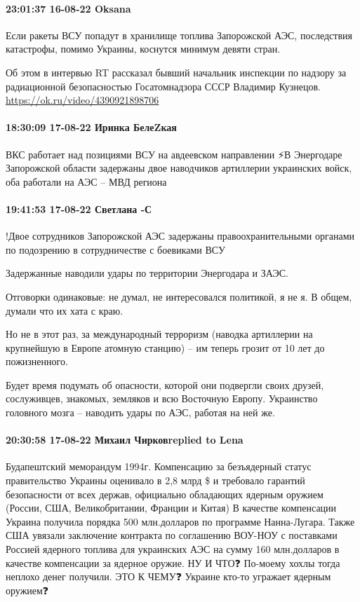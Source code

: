 \paragraph{23:01:37 16-08-22 Oksana 🌸🌸🌸}

Если ракеты ВСУ попадут в хранилище топлива Запорожской АЭС, последствия
катастрофы, помимо Украины, коснутся минимум девяти стран.

Об этом в интервью RT рассказал бывший начальник инспекции по надзору за
радиационной безопасностью Госатомнадзора СССР Владимир Кузнецов.
\url{https://ok.ru/video/4390921898706}

\paragraph{18:30:09 17-08-22 Иринка БелеZкая}

\obeycr
ВКС работает над позициями ВСУ на авдеевском направлении
⚡В Энергодаре Запорожской области задержаны двое наводчиков артиллерии украинских войск, оба работали на АЭС – МВД региона
\restorecr

\paragraph{19:41:53 17-08-22 Светлана -С}

!Двое сотрудников Запорожской АЭС задержаны правоохранительными органами по
подозрению в сотрудничестве с боевиками ВСУ

Задержанные наводили удары по территории Энергодара и ЗАЭС.

Отговорки одинаковые: не думал, не интересовался политикой, я не я. В общем,
думали что их хата с краю.

Но не в этот раз, за международный терроризм (наводка артиллерии на крупнейшую
в Европе атомную станцию) – им теперь грозит от 10 лет до пожизненного.

Будет время подумать об опасности, которой они подвергли своих друзей,
сослуживцев, знакомых, земляков и всю Восточную Европу.  Украинство головного
мозга – наводить удары по АЭС, работая на ней же.

\paragraph{20:30:58 17-08-22 Михаил Чирковreplied to Lena}

Будапештский меморандум 1994г.
Компенсацию за безъядерный статус правительство Украины оценивало в 2,8 млрд \$ и требовало гарантий безопасности от всех держав, официально обладающих ядерным оружием (России, США, Великобритании, Франции и Китая)
В качестве компенсации Украина получила порядка 500 млн.долларов по программе Нанна-Лугара. Также США увязали заключение контракта по соглашению ВОУ-НОУ с поставками Россией ядерного топлива для украинских АЭС на сумму 160 млн.долларов в качестве компенсации за ядерное оружие.
НУ И ЧТО❓
По-моему хохлы тогда неплохо денег получили.
ЭТО К ЧЕМУ❓
Украине кто-то угражает ядерным оружием❓

